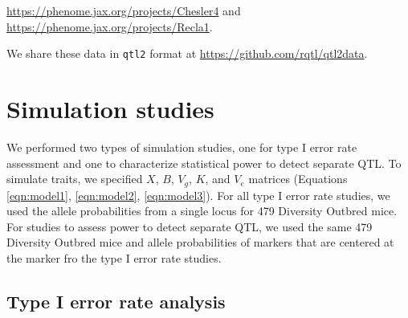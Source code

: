 \documentclass[12pt,twoside, lineno]{gsajnl}
\begin{document}
\href{https://phenome.jax.org/projects/Chesler4}{https://phenome.jax.org/projects/Chesler4} and \href{https://phenome.jax.org/projects/Recla1}{https://phenome.jax.org/projects/Recla1}. 

\noindent We share these data in \texttt{qtl2} format at \href{https://github.com/rqtl/qtl2data}{https://github.com/rqtl/qtl2data}.





\section{Simulation studies}

We performed two types of simulation studies, one for type I error rate assessment and one to characterize statistical power to detect separate QTL. To simulate traits, we specified $X$, $B$, $V_g$, $K$, and $V_e$ matrices (Equations \ref{eqn:model1}, \ref{eqn:model2}, \ref{eqn:model3}). For all type I error rate studies, we used the allele probabilities from a single locus for 479 Diversity Outbred mice. For studies to assess power to detect separate QTL, we used the same 479 Diversity Outbred mice and allele probabilities of markers that are centered at the marker fro
the type I error rate studies. 

\subsection{Type I error rate analysis}
\end{document}
